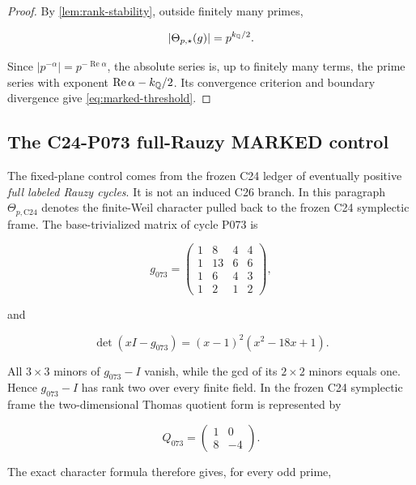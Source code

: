 \begin{proof}
By \cref{lem:rank-stability}, outside finitely many primes,

\[
 |\Theta_{p,\star}(g)|=p^{k_\mathbb Q/2}.
\]

Since \(|p^{-\alpha}|=p^{-\operatorname{Re}\alpha}\), the absolute series
is, up to finitely many terms, the prime series with exponent
\(\operatorname{Re}\alpha-k_\mathbb Q/2\).  Its convergence criterion and boundary
divergence give \cref{eq:marked-threshold}.
\end{proof}

\subsection{The C24-P073 full-Rauzy MARKED control}

The fixed-plane control comes from the frozen C24 ledger of eventually
positive \emph{full labeled Rauzy cycles}.  It is not an induced C26 branch.
In this paragraph \(\Theta_{p,\mathrm{C24}}\) denotes the finite-Weil
character pulled back to the frozen C24 symplectic frame.
The base-trivialized matrix of cycle P073 is

\begin{equation}
 g_{073}=
 \begin{pmatrix}
 1&8&4&4\\
 1&13&6&6\\
 1&6&4&3\\
 1&2&1&2
 \end{pmatrix},
 \label{eq:P073-matrix}
\end{equation}

and

\begin{equation}
 \det(xI-g_{073})=(x-1)^2(x^2-18x+1).
 \label{eq:P073-charpoly}
\end{equation}

All \(3\times3\) minors of \(g_{073}-I\) vanish, while the gcd of its
\(2\times2\) minors equals one.  Hence \(g_{073}-I\) has rank two over every
finite field.  In the frozen C24 symplectic frame the two-dimensional Thomas
quotient form is represented by

\begin{equation}
 Q_{073}=\begin{pmatrix}1&0\\8&-4\end{pmatrix}.
 \label{eq:P073-Q}
\end{equation}

The exact character formula therefore gives, for every odd prime,

